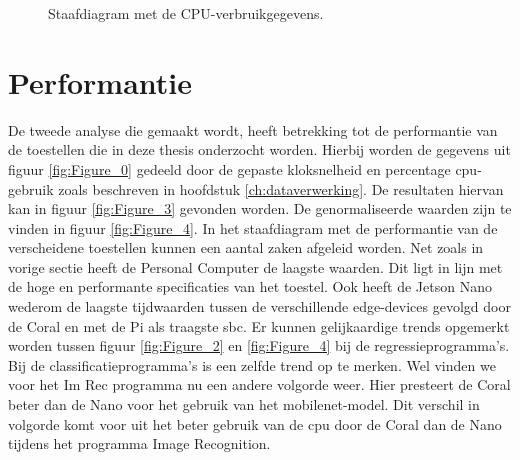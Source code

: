 
	\begin{figure}
		\caption{Staafdiagram met de CPU-verbruikgegevens.}
		\label{fig:Figure_1}
	\end{figure}

	\section{Performantie}
	De tweede analyse die gemaakt wordt, heeft betrekking tot de performantie van de toestellen die in deze thesis onderzocht worden. Hierbij worden de gegevens uit figuur \ref{fig:Figure_0} gedeeld door de gepaste kloksnelheid en percentage \gls{cpu}-gebruik zoals beschreven in hoofdstuk \ref{ch:dataverwerking}. De resultaten hiervan kan in figuur \ref{fig:Figure_3} gevonden worden. De genormaliseerde waarden zijn te vinden in figuur \ref{fig:Figure_4}.
	In het staafdiagram met de performantie van de verscheidene toestellen kunnen een aantal zaken afgeleid worden. Net zoals in vorige sectie heeft de Personal Computer de laagste waarden. Dit ligt in lijn met de hoge en performante specificaties van het toestel. Ook heeft de Jetson Nano wederom de laagste tijdwaarden tussen de verschillende edge-devices gevolgd door de Coral en met de Pi als traagste \gls{sbc}. Er kunnen gelijkaardige trends opgemerkt worden tussen figuur \ref{fig:Figure_2} en \ref{fig:Figure_4} bij de regressieprogramma's. Bij de classificatieprogramma's is een zelfde trend op te merken. Wel vinden we voor het Im Rec programma nu een andere volgorde weer. Hier presteert de Coral beter dan de Nano voor het gebruik van het mobilenet-model. Dit verschil in volgorde komt voor uit het beter gebruik van de \gls{cpu} door de Coral dan de Nano tijdens het programma Image Recognition.

